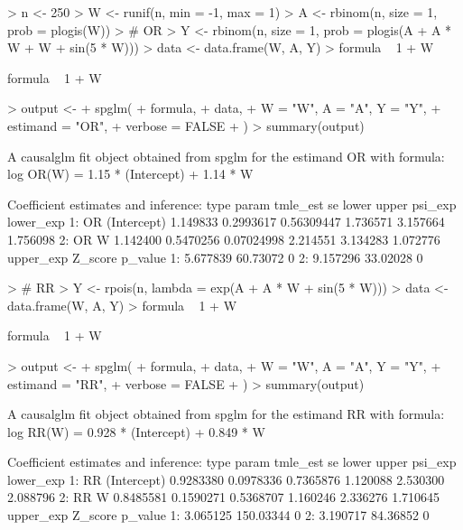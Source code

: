 \documentclass[article]{jss}
\begin{document}
\begin{Schunk}
\begin{Sinput}
> n <- 250
> W <- runif(n, min = -1, max = 1)
> A <- rbinom(n, size = 1, prob = plogis(W))
> # OR
> Y <- rbinom(n, size = 1, prob = plogis(A + A * W + W + sin(5 * W)))
> data <- data.frame(W, A, Y)
> formula ~ 1 + W
\end{Sinput}
\begin{Soutput}
formula ~ 1 + W
\end{Soutput}
\begin{Sinput}
> output <-
+   spglm(
+     formula,
+     data,
+     W = "W", A = "A", Y = "Y",
+     estimand = "OR",
+     verbose = FALSE
+   )
> summary(output)
\end{Sinput}
\begin{Soutput}
A causalglm fit object obtained from spglm for the estimand OR with formula: 
log OR(W) = 1.15 * (Intercept) + 1.14 * W

Coefficient estimates and inference:
   type       param tmle_est        se      lower    upper  psi_exp lower_exp
1:   OR (Intercept) 1.149833 0.2993617 0.56309447 1.736571 3.157664  1.756098
2:   OR           W 1.142400 0.5470256 0.07024998 2.214551 3.134283  1.072776
   upper_exp  Z_score p_value
1:  5.677839 60.73072       0
2:  9.157296 33.02028       0
\end{Soutput}
\begin{Sinput}
> # RR
> Y <- rpois(n, lambda = exp(A + A * W + sin(5 * W)))
> data <- data.frame(W, A, Y)
> formula ~ 1 + W
\end{Sinput}
\begin{Soutput}
formula ~ 1 + W
\end{Soutput}
\begin{Sinput}
> output <-
+   spglm(
+     formula,
+     data,
+     W = "W", A = "A", Y = "Y",
+     estimand = "RR",
+     verbose = FALSE
+   )
> summary(output)
\end{Sinput}
\begin{Soutput}
A causalglm fit object obtained from spglm for the estimand RR with formula: 
log RR(W) = 0.928 * (Intercept) + 0.849 * W

Coefficient estimates and inference:
   type       param  tmle_est        se     lower    upper  psi_exp lower_exp
1:   RR (Intercept) 0.9283380 0.0978336 0.7365876 1.120088 2.530300  2.088796
2:   RR           W 0.8485581 0.1590271 0.5368707 1.160246 2.336276  1.710645
   upper_exp   Z_score p_value
1:  3.065125 150.03344       0
2:  3.190717  84.36852       0
\end{Soutput}
\end{Schunk}
\end{document}
